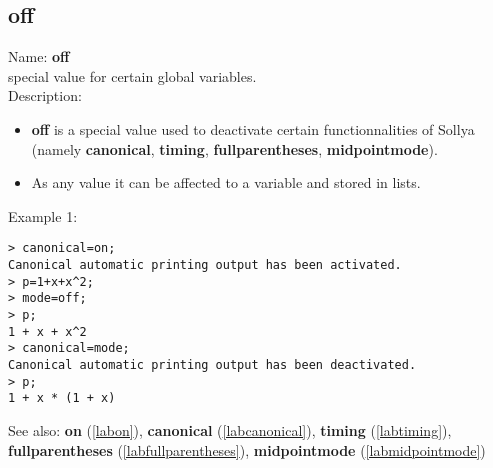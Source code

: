 \subsection{off}
\label{laboff}
\noindent Name: \textbf{off}\\
special value for certain global variables.\\

\noindent Description: \begin{itemize}

\item \textbf{off} is a special value used to deactivate certain functionnalities
   of Sollya (namely \textbf{canonical}, \textbf{timing}, \textbf{fullparentheses}, \textbf{midpointmode}).

\item As any value it can be affected to a variable and stored in lists.
\end{itemize}
\noindent Example 1: 
\begin{center}\begin{minipage}{15cm}\begin{Verbatim}[frame=single]
> canonical=on;
Canonical automatic printing output has been activated.
> p=1+x+x^2;
> mode=off;
> p;
1 + x + x^2
> canonical=mode;
Canonical automatic printing output has been deactivated.
> p;
1 + x * (1 + x)
\end{Verbatim}
\end{minipage}\end{center}
See also: \textbf{on} (\ref{labon}), \textbf{canonical} (\ref{labcanonical}), \textbf{timing} (\ref{labtiming}), \textbf{fullparentheses} (\ref{labfullparentheses}), \textbf{midpointmode} (\ref{labmidpointmode})

